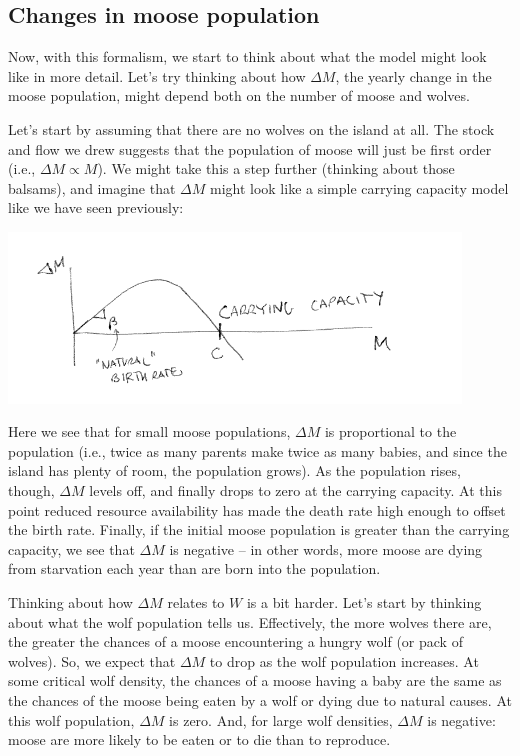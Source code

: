 \subsection{Changes in moose population}
Now, with this formalism, we start to think about what the model might look like in more detail.  Let's try thinking about how $\Delta M$, the yearly change in the moose population, might depend both on the number of moose and wolves.  

Let's start by assuming that there are no wolves on the island at all. The stock and flow we drew suggests that the population of moose will just be first order (i.e., $\Delta M \propto M$).  We might take this a step further (thinking about those balsams), and imagine that $\Delta M$ might look like a simple carrying capacity model like we have seen previously:

\includegraphics[width=12cm]{figs/DeltaMvsM}


Here we see that for small moose populations, $\Delta M$ is proportional to the population (i.e., twice as many parents make twice as many babies, and since the island has plenty of room, the population grows).  As the population rises, though, $\Delta M$ levels off, and finally drops to zero at the carrying capacity.  At this point reduced resource availability has made the death rate high enough to offset the birth rate.  Finally, if the initial moose population is greater than the carrying capacity, we see that $\Delta M$ is negative -- in other words, more moose are dying from starvation each year than are born into the population.

Thinking about how $\Delta M$ relates to $W$ is a bit harder.  Let's start by thinking about what the wolf population tells us.  Effectively, the more wolves there are, the greater the chances of a moose encountering a hungry wolf (or pack of wolves).  So, we expect that $\Delta M$ to drop as the wolf population increases.  At some critical wolf density, the chances of a moose having a baby are the same as the chances of the moose being eaten by a wolf or dying due to natural causes.  At this wolf population, $\Delta M$ is zero.  And, for  large wolf densities, $\Delta M$ is negative:  moose are more likely to be eaten or to die than to reproduce.


